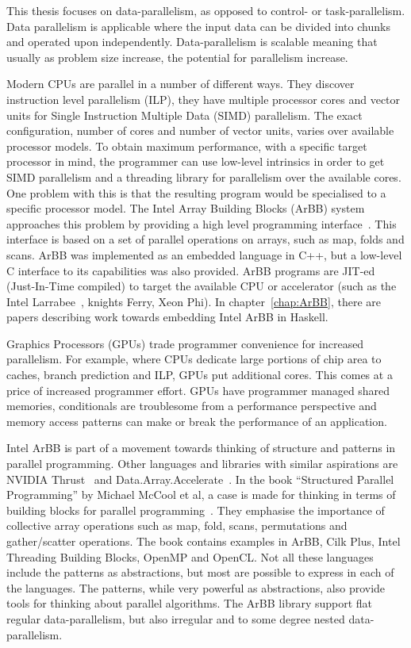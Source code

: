 \documentclass[a4paper]{book}
\begin{document}
This thesis focuses on data-parallelism, as opposed to control- or 
task-parallelism. Data parallelism is applicable where the input data can 
be divided into chunks and operated upon independently. Data-parallelism is scalable
meaning that usually as problem size increase, the potential for parallelism increase. 

Modern CPUs are parallel in a number of different ways. They discover instruction
level parallelism (ILP), they have multiple processor cores and vector units for 
Single Instruction Multiple Data (SIMD)  parallelism. The exact configuration, number
of cores and number of vector units, varies over available processor models. 
To obtain maximum performance, with a specific target processor in mind, the programmer
can use low-level intrinsics in order to get SIMD parallelism and a threading library
for parallelism over the available cores. One problem with this is that the resulting program 
would be specialised to a specific processor model. The Intel Array Building Blocks (ArBB) 
system approaches this problem by providing a high level programming interface~\citet{ARBB2011}.
This interface is based on a set of parallel operations on arrays, such as map, folds 
and scans. ArBB was implemented as an embedded language in C++, but a low-level C interface to 
its capabilities was also provided. ArBB programs are JIT-ed (Just-In-Time compiled) to 
target the available CPU or accelerator (such as the Intel Larrabee~\citet{Larrabee}, 
knights Ferry, Xeon Phi). In chapter~\ref{chap:ArBB}, there are papers describing work 
towards embedding Intel ArBB in Haskell. 

Graphics Processors (GPUs) trade programmer convenience for increased parallelism. 
For example, where CPUs dedicate large portions of chip area to caches, branch prediction and 
ILP, GPUs put additional cores. This comes at a price of increased programmer effort.
GPUs have programmer managed shared memories, conditionals are troublesome from a performance 
perspective and memory access patterns can make or break the performance of an 
application.  

Intel ArBB is part of a movement towards thinking of structure and patterns in 
parallel programming. Other languages and libraries with similar aspirations 
are NVIDIA Thrust~\citet{THRUST} and Data.Array.Accelerate~\citet{ACCELERATEDAMP11}.
In the book ``Structured Parallel Programming'' by Michael McCool et al, a case is 
made for thinking in terms of building blocks for parallel programming~\citet{STRUCTURED}. 
They emphasise the importance of collective array operations such as map, fold, scans, 
permutations and gather/scatter operations. The book contains examples in ArBB, Cilk Plus, 
Intel Threading Building Blocks, OpenMP and OpenCL. Not all these languages include 
the patterns as abstractions, but most are possible to express in each of the languages. 
The patterns, while very powerful as abstractions, also provide tools for thinking about 
parallel algorithms. The ArBB library support flat regular data-parallelism, but also 
irregular and to some degree nested data-parallelism. 
\end{document}
